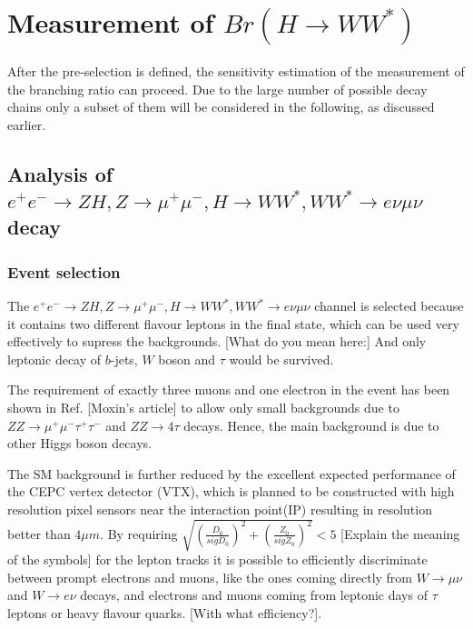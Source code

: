 \documentclass[11pt,a4paper]{cepcnote}
\begin{document}
\section{Measurement of $Br(H\rightarrow WW^*)$}
After the pre-selection is defined, the sensitivity estimation of
the measurement of the branching ratio can proceed. Due to the large number 
of possible decay chains only a subset of them will be considered in the
following, as discussed earlier.


\subsection{Analysis of $e^+e^-\rightarrow ZH, Z\rightarrow\mu^+\mu^-, H\rightarrow WW^*, WW^*\rightarrow e\nu\mu\nu$ decay}
\subsubsection{Event selection}
The $e^+e^-\rightarrow ZH, Z\rightarrow\mu^+\mu^-, H\rightarrow WW^*, WW^*\rightarrow e\nu\mu\nu$ channel is selected because it contains
two different flavour leptons in the final state, which can be used very
effectively to supress the backgrounds.
{\color{red} [What do you mean here:] And only leptonic decay of $b$-jets, $W$ boson and $\tau$ would be survived.}

The requirement of exactly three muons and one electron in the event has been
shown in Ref. {\color{red} [Moxin's article]} to allow only small backgrounds
due to $ZZ\rightarrow \mu^+\mu^-\tau^+\tau^-$ and $ZZ\rightarrow 4\tau$ decays.
Hence, the main background is due to other Higgs boson decays.

The SM background is further reduced by the excellent expected performance
of the CEPC vertex detector (VTX), which is planned to be 
constructed with high resolution pixel sensors near the interaction point(IP) 
resulting in resolution better than $4\mu m$.
By requiring $\sqrt{(\frac{D_{0}}{sigD_{0}})^2+(\frac{Z_{0}}{sigZ_{0}})^2} < 5$
{\color{red} [Explain the meaning of the symbols]}
for the lepton tracks it is possible to efficiently discriminate between
prompt electrons and muons, like the ones coming directly from $W\to\mu\nu$
and $W\to e\nu$ decays, and electrons and muons coming from leptonic
days of $\tau$ leptons or heavy flavour quarks. {\color{red} [With what efficiency?]}.
\end{document}
